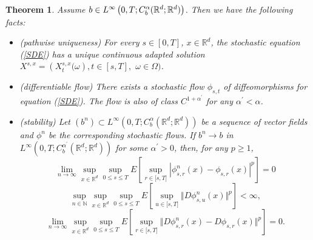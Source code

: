 \documentclass[a4paper,11pt]{article}
\newtheorem{theorem}{Theorem}
\begin{document}
\begin{theorem}
\label{th:flow1} Assume $b\in L^{\infty }\left( 0,T;C_{b}^{\alpha }({\mathbb{%
R}}^{d};{\mathbb{R}}^{d})\right) $. Then we have the following facts:

\begin{itemize}
\item[(i)]  (pathwise uniqueness) For every $s\in \left[ 0,T\right] $, $x\in
{\mathbb{R}}^{d}$, the stochastic equation (\ref{SDE}) has a unique
continuous adapted solution $X^{s,x}=\left( X_{t}^{s,x}\big(\omega \right)
,t\in \left[ s,T\right] ,$ $\omega \in \Omega \big)$.

\item[(ii)]  (differentiable flow) There exists a stochastic flow $\phi
_{s,t}$ of diffeomorphisms for equation (\ref{SDE}). The flow is also of
class $C^{1+{\alpha }^{\prime }}$ for any ${\alpha }^{\prime }<{\alpha }$.

\item[(iii)]  (stability) Let $(b^{n})\subset L^{\infty }\left(
0,T;C_{b}^{\alpha }({\mathbb{R}}^{d};{\mathbb{R}}^{d})\right) $ be a
sequence of vector fields and $\phi ^{n}$ be the corresponding stochastic
flows. If $b^{n}\rightarrow b$ in $L^{\infty }\left( 0,T;C_{b}^{\alpha
^{\prime }}({\mathbb{R}}^{d};{\mathbb{R}}^{d})\right) $ for some $\alpha
^{\prime }>0$, then, for any $p\geq 1$,
\begin{equation}
\lim_{n\rightarrow \infty }\sup_{x\in {\mathbb{R}}^{d}}\sup_{0\leq s\leq
T}E[\sup_{r\in \lbrack s,T]}|\phi _{s,r}^{n}(x)-\phi _{s,r}(x)|^{p}]=0
\label{stability1}
\end{equation}
\begin{equation}
\sup_{n\in \mathbb{N}}\sup_{x\in {\mathbb{R}}^{d}}\sup_{0\leq s\leq
T}E[\sup_{u\in \lbrack s,T]}\Vert D\phi _{s,u}^{n}(x)\Vert ^{p}]<\infty ,
\label{bound}
\end{equation}
\begin{equation}
\lim_{n\rightarrow \infty }\sup_{x\in {\mathbb{R}}^{d}}\sup_{0\leq s\leq
T}E[\sup_{r\in \lbrack s,T]}\Vert D\phi _{s,r}^{n}(x)-D\phi _{s,r}(x)\Vert
^{p}]=0.  \label{stability2}
\end{equation}
\end{itemize}
\end{theorem}

\end{document}
